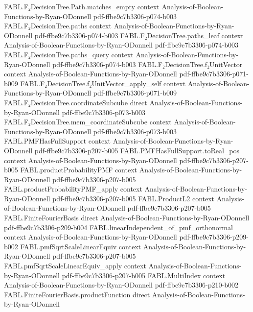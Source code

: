 \begin{theorem}
\proofstep
  {FABL.F₂DecisionTree.Path.matches_empty}
  {context}
  {Analysis-of-Boolean-Functions-by-Ryan-ODonnell}
  {pdf-ffbe9c7b3306-p074-b003}
\proofstep
  {FABL.F₂DecisionTree.paths}
  {context}
  {Analysis-of-Boolean-Functions-by-Ryan-ODonnell}
  {pdf-ffbe9c7b3306-p074-b003}
\proofstep
  {FABL.F₂DecisionTree.paths_leaf}
  {context}
  {Analysis-of-Boolean-Functions-by-Ryan-ODonnell}
  {pdf-ffbe9c7b3306-p074-b003}
\proofstep
  {FABL.F₂DecisionTree.paths_query}
  {context}
  {Analysis-of-Boolean-Functions-by-Ryan-ODonnell}
  {pdf-ffbe9c7b3306-p074-b003}
\proofstep
  {FABL.F₂DecisionTree.f₂UnitVector}
  {context}
  {Analysis-of-Boolean-Functions-by-Ryan-ODonnell}
  {pdf-ffbe9c7b3306-p071-b009}
\proofstep
  {FABL.F₂DecisionTree.f₂UnitVector_apply_self}
  {context}
  {Analysis-of-Boolean-Functions-by-Ryan-ODonnell}
  {pdf-ffbe9c7b3306-p071-b009}
\proofstep
  {FABL.F₂DecisionTree.coordinateSubcube}
  {direct}
  {Analysis-of-Boolean-Functions-by-Ryan-ODonnell}
  {pdf-ffbe9c7b3306-p073-b003}
\proofstep
  {FABL.F₂DecisionTree.mem_coordinateSubcube}
  {context}
  {Analysis-of-Boolean-Functions-by-Ryan-ODonnell}
  {pdf-ffbe9c7b3306-p073-b003}
\proofstep
  {FABL.PMFHasFullSupport}
  {context}
  {Analysis-of-Boolean-Functions-by-Ryan-ODonnell}
  {pdf-ffbe9c7b3306-p207-b005}
\proofstep
  {FABL.PMFHasFullSupport.toReal_pos}
  {context}
  {Analysis-of-Boolean-Functions-by-Ryan-ODonnell}
  {pdf-ffbe9c7b3306-p207-b005}
\proofstep
  {FABL.productProbabilityPMF}
  {context}
  {Analysis-of-Boolean-Functions-by-Ryan-ODonnell}
  {pdf-ffbe9c7b3306-p207-b005}
\proofstep
  {FABL.productProbabilityPMF_apply}
  {context}
  {Analysis-of-Boolean-Functions-by-Ryan-ODonnell}
  {pdf-ffbe9c7b3306-p207-b005}
\proofstep
  {FABL.ProductL2}
  {context}
  {Analysis-of-Boolean-Functions-by-Ryan-ODonnell}
  {pdf-ffbe9c7b3306-p207-b005}
\proofstep
  {FABL.FiniteFourierBasis}
  {direct}
  {Analysis-of-Boolean-Functions-by-Ryan-ODonnell}
  {pdf-ffbe9c7b3306-p209-b004}
\proofstep
  {FABL.linearIndependent_of_pmf_orthonormal}
  {context}
  {Analysis-of-Boolean-Functions-by-Ryan-ODonnell}
  {pdf-ffbe9c7b3306-p209-b002}
\proofstep
  {FABL.pmfSqrtScaleLinearEquiv}
  {context}
  {Analysis-of-Boolean-Functions-by-Ryan-ODonnell}
  {pdf-ffbe9c7b3306-p207-b005}
\proofstep
  {FABL.pmfSqrtScaleLinearEquiv_apply}
  {context}
  {Analysis-of-Boolean-Functions-by-Ryan-ODonnell}
  {pdf-ffbe9c7b3306-p207-b005}
\proofstep
  {FABL.MultiIndex}
  {context}
  {Analysis-of-Boolean-Functions-by-Ryan-ODonnell}
  {pdf-ffbe9c7b3306-p210-b002}
\proofstep
  {FABL.FiniteFourierBasis.productFunction}
  {direct}
  {Analysis-of-Boolean-Functions-by-Ryan-ODonnell}

\end{theorem}
